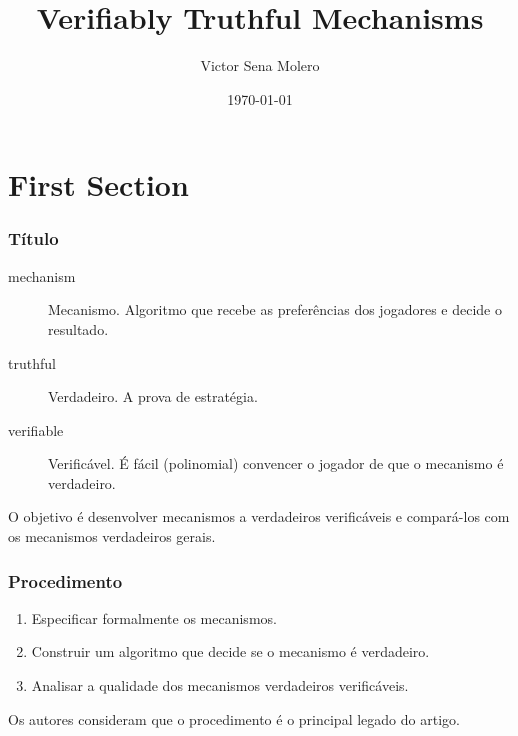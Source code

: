 \documentclass[usenames,dvipsnames]{beamer}
\title[Verifiably Truthful Mechanisms]{Verifiably Truthful Mechanisms} %
\author{Victor Sena Molero} %
\institute[IME-USP] %
{
Universidade de São Paulo \\ %
\medskip
\textit{victorsenam@gmail.com} %
}
\date{\today} %
\begin{document}
\begin{frame}
\titlepage %
\end{frame}



\section{First Section} %

\begin{frame}
\frametitle{Título}
\begin{description}
\item [mechanism] Mecanismo. Algoritmo que recebe as preferências dos jogadores e decide o resultado.
\item [truthful] Verdadeiro. A prova de estratégia.
\item [verifiable] Verificável. É fácil (polinomial) convencer o jogador de que o mecanismo é verdadeiro.
\end{description}

O objetivo é desenvolver mecanismos a verdadeiros verificáveis e compará-los com os mecanismos verdadeiros gerais.
\end{frame}

\begin{frame}
\frametitle{Procedimento}
\begin{enumerate}
\item Especificar formalmente os mecanismos.
\item Construir um algoritmo que decide se o mecanismo é verdadeiro.
\item Analisar a qualidade dos mecanismos verdadeiros verificáveis.
\end{enumerate}

Os autores consideram que o procedimento é o principal legado do artigo.
\end{frame}
\end{document}
